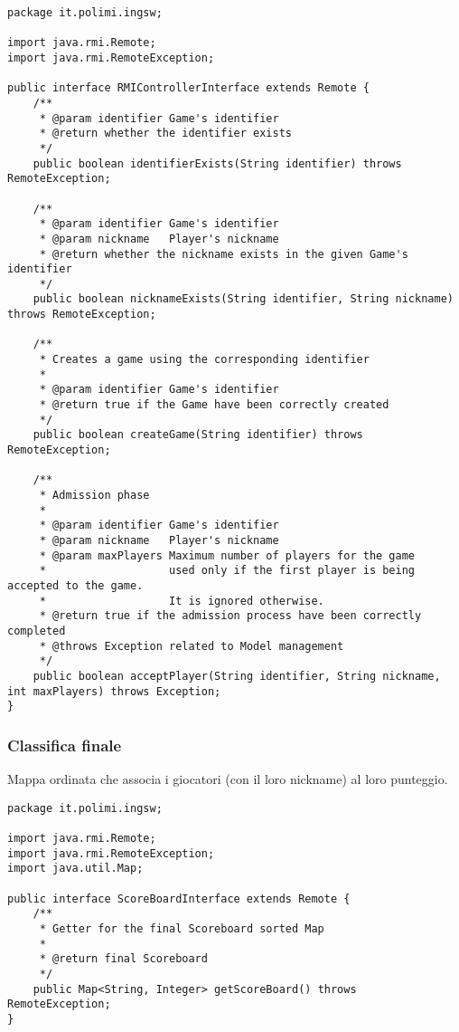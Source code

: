 \documentclass[a4paper,11pt]{article} %
\begin{document}
    \begin{verbatim}
package it.polimi.ingsw;

import java.rmi.Remote;
import java.rmi.RemoteException;

public interface RMIControllerInterface extends Remote {
    /**
     * @param identifier Game's identifier
     * @return whether the identifier exists
     */
    public boolean identifierExists(String identifier) throws RemoteException;

    /**
     * @param identifier Game's identifier
     * @param nickname   Player's nickname
     * @return whether the nickname exists in the given Game's identifier
     */
    public boolean nicknameExists(String identifier, String nickname) throws RemoteException;

    /**
     * Creates a game using the corresponding identifier
     *
     * @param identifier Game's identifier
     * @return true if the Game have been correctly created
     */
    public boolean createGame(String identifier) throws RemoteException;

    /**
     * Admission phase
     *
     * @param identifier Game's identifier
     * @param nickname   Player's nickname
     * @param maxPlayers Maximum number of players for the game
     *                   used only if the first player is being accepted to the game.
     *                   It is ignored otherwise.
     * @return true if the admission process have been correctly completed
     * @throws Exception related to Model management
     */
    public boolean acceptPlayer(String identifier, String nickname, int maxPlayers) throws Exception;
}
    \end{verbatim}

    \newpage

    \subsubsection{Classifica finale}
    Mappa ordinata che associa i giocatori (con il loro nickname) al loro punteggio.

    \begin{verbatim}
package it.polimi.ingsw;

import java.rmi.Remote;
import java.rmi.RemoteException;
import java.util.Map;

public interface ScoreBoardInterface extends Remote {
    /**
     * Getter for the final Scoreboard sorted Map
     *
     * @return final Scoreboard
     */
    public Map<String, Integer> getScoreBoard() throws RemoteException;
}
    \end{verbatim}
\end{document}
